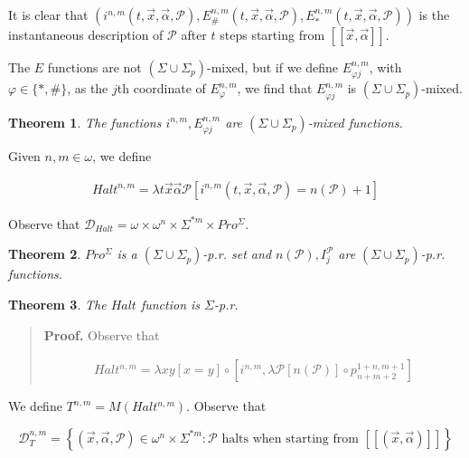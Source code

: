 \documentclass[a4paper, 12pt]{article}
\newtheorem{theorem}{Theorem}
\newtheorem{theorem}{Theorem}
\begin{document}
It is clear that $\left( i^{n, m}(t, \vec{x}, \vec{\alpha}, \mathcal{P}),
E_{\#}^{n, m}(t, \vec{x}, \vec{\alpha}, \mathcal{P}), E_{*}^{n,m}(t, \vec{x},
\vec{\alpha}, \mathcal{P}) \right) $ is the instantaneous description of
$\mathcal{P}$ after $t$ steps starting from $[\![ \vec{x}, \vec{\alpha} ]\!]$.

The $E$ functions are not $( \Sigma \cup \Sigma_p )$-mixed, but if we define $E^{n, m}_{\varphi
j}$, with $\varphi \in \{*, \#\}$, as the $j$th coordinate of $E^{n,
m}_{\varphi}$, we find that $E_{\varphi j}^{n, m}$ is $( \Sigma \cup \Sigma_p )$-mixed.

\begin{theorem}
    The functions $i^{n, m}, E_{\varphi j}^{n, m}$ are $(\Sigma \cup \Sigma_p)$-mixed functions.
\end{theorem}

Given $n, m \in  \omega$, we define 

\begin{align*}
    Halt^{n, m} = \lambda t\vec{x}\vec{\alpha} \mathcal{P} \left[ i^{n, m}(t,
    \vec{x}, \vec{\alpha}, \mathcal{P}) = n(\mathcal{P}) + 1  \right]
\end{align*}

Observe that $\mathcal{D}_{Halt} = \omega \times \omega^{n} \times \Sigma^{*m}
\times Pro^{\Sigma}$.

\begin{theorem}
    $Pro^{\Sigma}$ is a $( \Sigma \cup \Sigma_p )$-p.r. set and $n(\mathcal{P}),
    I_{j}^{\mathcal{P}}$ are $( \Sigma \cup \Sigma_p )$-p.r. functions.
\end{theorem}

\begin{theorem}
    The $Halt$ function is $\Sigma$-p.r. 
\end{theorem}


\small
\begin{quote}

\textbf{Proof.} Observe that 

\begin{align*}
    Halt^{n, m} = \lambda xy \left[ x = y  \right] \circ \left[ i^{n, m},
    \lambda \mathcal{P} \left[ n(\mathcal{P})  \right] \circ p_{n+m+2}^{1+n, m +
1} \right] 
\end{align*}

\end{quote}
\normalsize

We define $T^{n, m} = M(Halt^{n, m})$. Observe that 

$$\mathcal{D}_T^{n, m} =
\left\{ (\vec{x}, \vec{\alpha}, \mathcal{P}) \in \omega^{n} \times \Sigma^{*m} : \mathcal{P}
\text{ halts when starting from } [\![ (\vec{x}, \vec{\alpha})  ]\!]\right\} $$
\end{document}
